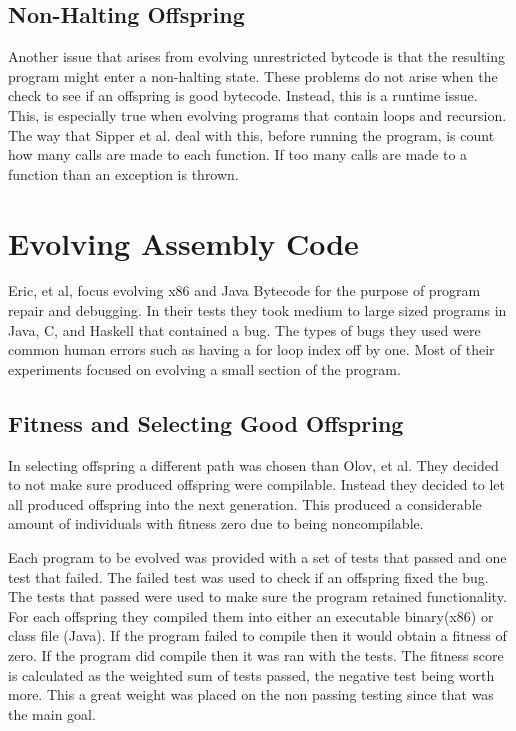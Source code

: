\documentclass{sig-alternate}
\begin{document}
\subsection{Non-Halting Offspring}
Another issue that arises from evolving unrestricted bytcode is that the resulting program might enter a non-halting state. These problems do not arise when the check to see if an offspring is good bytecode. Instead, this is a runtime issue. This, is especially true when evolving programs that contain loops and recursion.
The way that Sipper et al.\cite{FINCH:2011} deal with this, before running the program, is count how many calls are made to each function. If too many calls are made to a function than an exception is thrown.






\section{Evolving Assembly Code}
Eric, et al, focus evolving x86 and Java Bytecode for the purpose of program repair and debugging. In their tests they took medium to large sized programs in Java, C, and Haskell that contained a bug. The types of bugs they used were common human errors such as having a for loop index off by one. Most of their experiments focused on evolving a small section of the program.
\subsection{Fitness and Selecting Good Offspring } 
In selecting offspring a different path was chosen than Olov, et al. They decided to not make sure produced offspring were compilable. Instead they decided to let all produced offspring into the next generation. This produced a considerable amount of individuals with fitness zero due to being noncompilable. 

Each program to be evolved was provided with a set of tests that passed and one test that failed. The failed test was used to check if an offspring fixed the bug. The tests that passed were used to make sure the program retained functionality. For each offspring they compiled them into either an executable binary(x86) or class file (Java). If the program failed to compile then it would obtain a fitness of zero. If the program did compile then it was ran with the tests. The fitness score is calculated as the weighted sum of tests passed, the negative test being worth more. This a great weight was placed on the non passing testing since that was the main goal.
\end{document}
